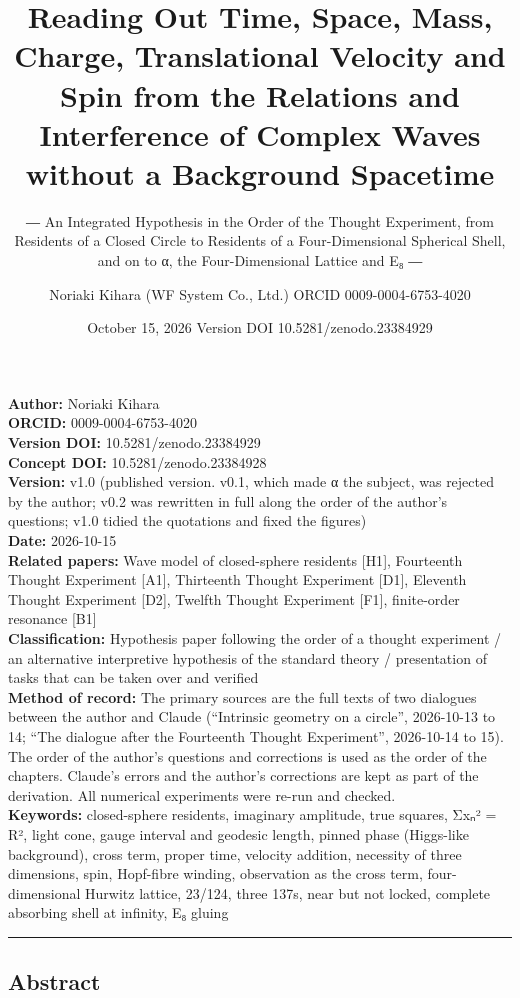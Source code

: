 \documentclass[
  a4paper,
]{article}
\title{Reading Out Time, Space, Mass, Charge, Translational Velocity and
Spin from the Relations and Interference of Complex Waves without a
Background Spacetime}
\subtitle{― An Integrated Hypothesis in the Order of the Thought
Experiment, from Residents of a Closed Circle to Residents of a
Four-Dimensional Spherical Shell, and on to α, the Four-Dimensional
Lattice and E₈ ―}
\author{Noriaki Kihara (WF System Co., Ltd.) ORCID 0009-0004-6753-4020}
\date{October 15, 2026 Version DOI 10.5281/zenodo.23384929}
\begin{document}
\maketitle

\textbf{Author:} Noriaki Kihara\\
\textbf{ORCID:} 0009-0004-6753-4020\\
\textbf{Version DOI:} 10.5281/zenodo.23384929\\
\textbf{Concept DOI:} 10.5281/zenodo.23384928\\
\textbf{Version:} v1.0 (published version. v0.1, which made α the
subject, was rejected by the author; v0.2 was rewritten in full along
the order of the author's questions; v1.0 tidied the quotations and
fixed the figures)\\
\textbf{Date:} 2026-10-15\\
\textbf{Related papers:} Wave model of closed-sphere residents {[}H1{]},
Fourteenth Thought Experiment {[}A1{]}, Thirteenth Thought Experiment
{[}D1{]}, Eleventh Thought Experiment {[}D2{]}, Twelfth Thought
Experiment {[}F1{]}, finite-order resonance {[}B1{]}\\
\textbf{Classification:} Hypothesis paper following the order of a
thought experiment / an alternative interpretive hypothesis of the
standard theory / presentation of tasks that can be taken over and
verified\\
\textbf{Method of record:} The primary sources are the full texts of two
dialogues between the author and Claude (``Intrinsic geometry on a
circle'', 2026-10-13 to 14; ``The dialogue after the Fourteenth Thought
Experiment'', 2026-10-14 to 15). The order of the author's questions and
corrections is used as the order of the chapters. Claude's errors and
the author's corrections are kept as part of the derivation. All
numerical experiments were re-run and checked.\\
\textbf{Keywords:} closed-sphere residents, imaginary amplitude, true
squares, Σxₙ² = R², light cone, gauge interval and geodesic length,
pinned phase (Higgs-like background), cross term, proper time, velocity
addition, necessity of three dimensions, spin, Hopf-fibre winding,
observation as the cross term, four-dimensional Hurwitz lattice, 23/124,
three 137s, near but not locked, complete absorbing shell at infinity,
E₈ gluing

\begin{center}\rule{0.5\linewidth}{0.5pt}\end{center}

\subsection{Abstract}\label{abstract}
\end{document}
